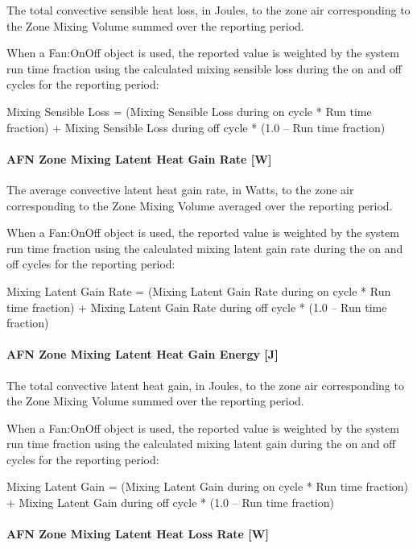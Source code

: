 The total convective sensible heat loss, in Joules, to the zone air corresponding to the Zone Mixing Volume summed over the reporting period.

When a Fan:OnOff object is used, the reported value is weighted by the system run time fraction using the calculated mixing sensible loss during the on and off cycles for the reporting period:

Mixing Sensible Loss = (Mixing Sensible Loss during on cycle * Run time fraction) + Mixing Sensible Loss during off cycle * (1.0 -- Run time fraction)

\paragraph{AFN Zone Mixing Latent Heat Gain Rate {[}W{]}}\label{afn-zone-mixing-latent-heat-gain-rate-w}

The average convective latent heat gain rate, in Watts, to the zone air corresponding to the Zone Mixing Volume averaged over the reporting period.

When a Fan:OnOff object is used, the reported value is weighted by the system run time fraction using the calculated mixing latent gain rate during the on and off cycles for the reporting period:

Mixing Latent Gain Rate = (Mixing Latent Gain Rate during on cycle * Run time fraction) + Mixing Latent Gain Rate during off cycle * (1.0 -- Run time fraction)

\paragraph{AFN Zone Mixing Latent Heat Gain Energy {[}J{]}}\label{afn-zone-mixing-latent-heat-gain-energy-j}

The total convective latent heat gain, in Joules, to the zone air corresponding to the Zone Mixing Volume summed over the reporting period.

When a Fan:OnOff object is used, the reported value is weighted by the system run time fraction using the calculated mixing latent gain during the on and off cycles for the reporting period:

Mixing Latent Gain = (Mixing Latent Gain during on cycle * Run time fraction) + Mixing Latent Gain during off cycle * (1.0 -- Run time fraction)

\paragraph{AFN Zone Mixing Latent Heat Loss Rate {[}W{]}}\label{afn-zone-mixing-latent-heat-loss-rate-w}

